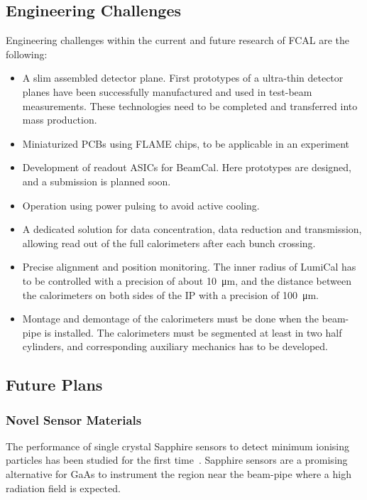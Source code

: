 \subsection{Engineering Challenges}
Engineering challenges within the current and future research of FCAL are the following:
\begin{itemize}
\item A slim assembled detector plane. First prototypes of a ultra-thin detector planes have been successfully
manufactured and used in test-beam measurements.
These technologies need to be completed and transferred into mass production. 
\item Miniaturized PCBs using FLAME chips, to be applicable in an experiment 
\item Development of readout ASICs for BeamCal.
Here prototypes are designed, and a submission is planned soon.
\item Operation using power pulsing to avoid active cooling.
\item A dedicated solution for data concentration, data reduction and transmission, allowing read out of 
the full calorimeters after each bunch crossing.
\item Precise alignment and position monitoring. The inner radius of LumiCal has to be controlled with a precision
of about \SI{10}{\micro\meter}, and the distance between the 
calorimeters on both sides of the IP with a precision of \SI{100}{\micro\meter}.
\item Montage and demontage of the calorimeters must be done when the beam-pipe is installed. The calorimeters must be segmented at 
least in two half cylinders, and corresponding auxiliary mechanics has to be developed.
\end{itemize}

\subsection{Future Plans}

\subsubsection{Novel Sensor Materials}

The performance of single crystal Sapphire sensors to detect minimum ionising particles has been studied for the 
first time~\cite{1748-0221-10-08-P08008}. Sapphire sensors are a promising alternative for GaAs to instrument
the region near the beam-pipe where a high radiation field is expected.

